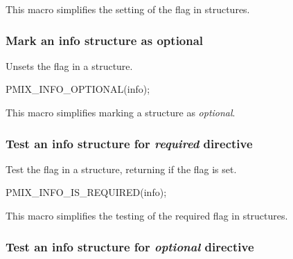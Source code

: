 \begin{arglist}
\end{arglist}

This macro simplifies the setting of the  flag in  structures.

\subsubsection{Mark an info structure as optional}

\summary
Unsets the  flag in a  structure.

\cspecificstart
\begin{codepar}
PMIX_INFO_OPTIONAL(info);
\end{codepar}
\cspecificend

\begin{arglist}
\end{arglist}

This macro simplifies marking a  structure as \textit{optional}.

\subsubsection{Test an info structure for \textit{required} directive}

\summary

Test the  flag in a  structure, returning  if the flag is set.

\cspecificstart
\begin{codepar}
PMIX_INFO_IS_REQUIRED(info);
\end{codepar}
\cspecificend

\begin{arglist}
\end{arglist}

This macro simplifies the testing of the required flag in  structures.

\subsubsection{Test an info structure for \textit{optional} directive}

